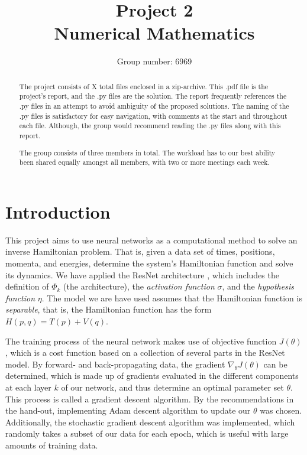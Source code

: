 \documentclass{article}
\title{Project 2 \\ \Large Numerical Mathematics}
\author{Group number: 6969}
\date{}
\begin{document}
\maketitle

\begin{abstract}
    The project consists of X total files enclosed in a zip-archive. This .pdf file is the project's report, and the .py files are the solution. The report frequently references the .py files in an attempt to avoid ambiguity of the proposed solutions. The naming of the .py files is satisfactory for easy navigation, with comments at the start and throughout each file. Although, the group would recommend reading the .py files along with this report. 
    
    The group consists of three members in total. The workload has to our best ability been shared equally amongst all members, with two or more meetings each week.
\end{abstract}

\tableofcontents

\section{Introduction}
This project aims to use neural networks as a computational method to solve an inverse Hamiltonian problem. That is, given a data set of times, positions, momenta, and energies, determine the system's Hamiltonian function and solve its dynamics. We have applied the ResNet architecture \cite{he2015deep}, which includes the definition of $\Phi_k$ (the architecture), the \textit{activation function} $\sigma$, and the \textit{hypothesis function} $\eta$. The model we are have used assumes that the Hamiltonian function is \textit{separable}, that is, the Hamiltonian function has the form $H(p,q) = T(p) + V(q)$. 

The training process of the neural network makes use of objective function $J(\theta)$, which is a cost function based on a collection of several parts in the ResNet model. By forward- and back-propagating data, the gradient $\nabla_\theta J(\theta)$ can be determined, which is made up of gradients evaluated in the different components at each layer $k$ of our network, and thus determine an optimal parameter set $\theta$. This process is called a gradient descent algorithm. By the recommendations in the hand-out, implementing Adam descent algorithm to update our $\theta$ was chosen. Additionally, the stochastic gradient descent algorithm was implemented, which randomly takes a subset of our data for each epoch, which is useful with large amounts of training data. 
\end{document}

